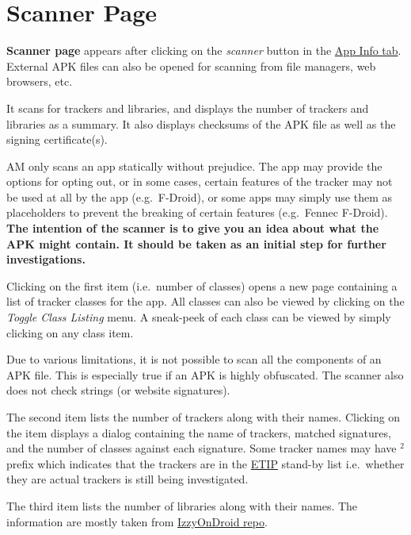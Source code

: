 \section{Scanner Page}\label{sec:scanner-page}
\textbf{Scanner page} appears after clicking on the \emph{scanner} button in the \hyperref[subsec:app-info-tab]{App Info
tab}. External APK files can also be opened for scanning from file managers, web browsers, etc.

It scans for trackers and libraries, and displays the number of trackers and libraries as a summary. It also displays
checksums of the APK file as well as the signing certificate(s).

\begin{danger}[Disclaimer]
    AM only scans an app statically without prejudice. The app may provide the options for opting out, or in some cases,
    certain features of the tracker may not be used at all by the app (e.g.\ F-Droid), or some apps may simply use them
    as placeholders to prevent the breaking of certain features (e.g.\ Fennec F-Droid). \textbf{The intention of the
    scanner is to give you an idea about what the APK might contain. It should be taken as an initial step for further
    investigations.}
\end{danger}

Clicking on the first item (i.e.\ number of classes) opens a new page containing a list of tracker classes for the app.
All classes can also be viewed by clicking on the \textit{Toggle Class Listing} menu. A sneak-peek of each class can be
viewed by simply clicking on any class item.

\begin{tip}[Notice]
    Due to various limitations, it is not possible to scan all the components of an APK file. This is especially true if
    an APK is highly obfuscated. The scanner also does not check strings (or website signatures).
\end{tip}

The second item lists the number of trackers along with their names. Clicking on the item displays a dialog containing
the name of trackers, matched signatures, and the number of classes against each signature. Some tracker names may have
$^2$ prefix which indicates that the trackers are in the \href{https://etip.exodus-privacy.eu.org}{ETIP} stand-by list
i.e.\ whether they are actual trackers is still being investigated.

The third item lists the number of libraries along with their names. The information are mostly taken from
\href{https://gitlab.com/IzzyOnDroid/repo}{IzzyOnDroid repo}.


